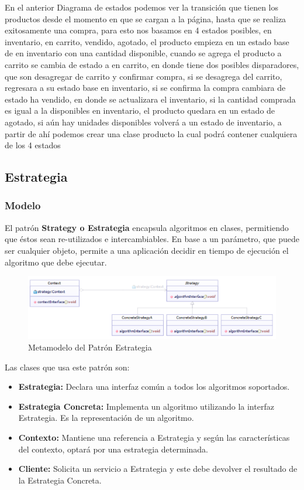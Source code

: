 En el anterior Diagrama de estados podemos ver la transición que tienen los productos desde el momento en que se cargan a la página, hasta que se realiza exitosamente una  compra, para esto nos basamos en 4 estados posibles, en inventario, en carrito, vendido, agotado, el producto empieza en un estado base de en inventario con una cantidad disponible, cuando se agrega el producto a carrito se cambia de estado a en carrito, en donde tiene dos posibles disparadores, que son desagregar de carrito y confirmar compra, si se desagrega del carrito, regresara a su estado base en inventario, si se confirma la compra cambiara de estado ha vendido, en donde se actualizara el inventario, si la cantidad comprada es igual a la disponibles en inventario, el producto quedara en un estado de agotado, si aún hay unidades disponibles volverá a un estado de inventario, a partir de ahí podemos crear una clase producto la cual podrá contener cualquiera de los 4 estados


\subsection{Estrategia}
\subsubsection{Modelo}

El patrón \textbf{Strategy o Estrategia} encapsula algoritmos en clases, permitiendo que éstos sean re-utilizados e intercambiables. En base a un parámetro, que puede ser cualquier objeto, permite a una aplicación decidir en tiempo de ejecución el algoritmo que debe ejecutar.

\begin{figure}[th!]
	\centering
	\includegraphics[width=1\linewidth]{arquitectura/imagenes/modeloEstrategia}
	\caption{Metamodelo del Patrón Estrategia}
	\label{fig:metamodelo patron estrategia}
\end{figure}

Las clases que usa este patrón son:
\begin{itemize}
	\item \textbf{Estrategia: }Declara una interfaz común a todos los algoritmos soportados.
	\item \textbf{Estrategia Concreta: }Implementa un algoritmo utilizando la interfaz Estrategia. Es la representación de un algoritmo.
	\item \textbf{Contexto: }Mantiene una referencia a Estrategia y según las características del contexto, optará por una estrategia determinada.
	\item \textbf{Cliente: }Solicita un servicio a Estrategia y este debe devolver el resultado de la Estrategia Concreta.
\end{itemize}

